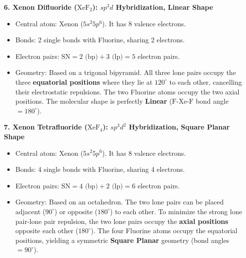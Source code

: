 \documentclass[12pt,a4paper]{article}
\begin{document}
\textbf{6. Xenon Difluoride ($\text{XeF}_2$): $sp^3d$ Hybridization, Linear Shape}
\begin{itemize}[leftmargin=*, itemsep=1pt]
  \item Central atom: Xenon ($5s^2 5p^6$). It has 8 valence electrons.
  \item Bonds: 2 single bonds with Fluorine, sharing 2 electrons.
  \item Electron pairs: $\text{SN} = 2\text{ (bp)} + 3\text{ (lp)} = 5$ electron pairs.
  \item Geometry: Based on a trigonal bipyramid. All three lone pairs occupy the three \textbf{equatorial positions} where they lie at $120^\circ$ to each other, cancelling their electrostatic repulsions. The two Fluorine atoms occupy the two axial positions. The molecular shape is perfectly \textbf{Linear} ($\text{F-Xe-F}$ bond angle $= 180^\circ$).
\end{itemize}

\textbf{7. Xenon Tetrafluoride ($\text{XeF}_4$): $sp^3d^2$ Hybridization, Square Planar Shape}
\begin{itemize}[leftmargin=*, itemsep=1pt]
  \item Central atom: Xenon ($5s^2 5p^6$). It has 8 valence electrons.
  \item Bonds: 4 single bonds with Fluorine, sharing 4 electrons.
  \item Electron pairs: $\text{SN} = 4\text{ (bp)} + 2\text{ (lp)} = 6$ electron pairs.
  \item Geometry: Based on an octahedron. The two lone pairs can be placed adjacent ($90^\circ$) or opposite ($180^\circ$) to each other.
    To minimize the strong lone pair-lone pair repulsion, the two lone pairs occupy the \textbf{axial positions} opposite each other ($180^\circ$). The four Fluorine atoms occupy the equatorial positions, yielding a symmetric \textbf{Square Planar} geometry (bond angles $= 90^\circ$).
\end{itemize}
\end{document}

